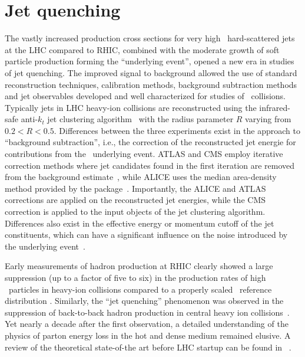 \section{Jet quenching}
\label{jets_intro}

The vastly increased production cross sections for very high \pT\ hard-scattered jets at the LHC
compared to RHIC, combined with the moderate growth of soft particle production forming the ``underlying
event'', opened a new era in studies of jet quenching. The improved signal to background allowed the
use of standard reconstruction techniques, calibration methods, background subtraction methods and
jet observables developed and well characterized for studies of \pp\ collisions.
Typically jets in LHC heavy-ion collisions are reconstructed using
the infrared-safe anti-$k_t$ jet clustering algorithm~\cite{Cacciari:2008gp} with the
radius parameter $R$ varying from $0.2 < R  < 0.5$. Differences between the three
experiments exist in the approach to ``background subtraction'', i.e., the correction
of the reconstructed jet energie for contributions from the \PbPb\ underlying event. 
ATLAS and CMS employ iterative correction methods where jet candidates found in
the first iteration are removed from the background estimate~\cite{Kodolova:2007hd,Grau:2008ed},
while ALICE uses the median area-density method provided by the {} package~\cite{Cacciari:2011ma}.
Importantly, the ALICE and ATLAS corrections are applied on the reconstructed jet energies,
while the CMS correction is applied to the input objects of the jet clustering algorithm.
Differences also exist in the effective energy or momentum cutoff of the jet constituents,
which can have a significant influence on the noise introduced by the underlying event~\cite{Abelev:2012ej}.

Early measurements of hadron production at RHIC
clearly showed a large suppression (up to a factor of five to six) in the production rates of
high \pT\ particles in heavy-ion collisions compared to a properly scaled \pp\ reference distribution
\cite{Adcox:2001jp,Adler:2002xw}. Similarly, the ``jet quenching'' phenomenon was observed
in the suppression of back-to-back hadron production
in central heavy ion collisions~\cite{Adcox:2001jp,Adler:2002xw}. Yet nearly a decade after the first observation, a detailed
understanding of the physics of parton energy loss in the hot and dense medium remained
elusive. A review of the theoretical state-of-the art before LHC startup can be
found in ~\cite{Wiedemann:2009sh}.

